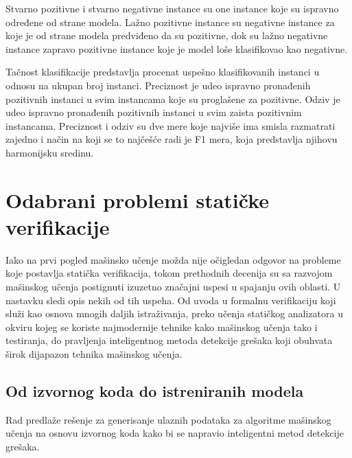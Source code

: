 \documentclass[a4paper]{article}
\theoremstyle{definition}
\begin{document}
{Stvarno pozitivne i stvarno negativne instance su one instance koje su ispravno 
određene od strane modela. Lažno pozitivne instance su negativne instance za koje 
je od strane modela predviđeno da su pozitivne, dok su lažno negativne instance 
zapravo pozitivne instance koje je model loše klasifikovao kao negativne. 

Tačnost klasifikacije predstavlja procenat uspešno klasifikovanih instanci u odnosu 
na ukupan broj instanci. Preciznost je udeo ispravno pronađenih pozitivnih instanci 
u svim instancama koje su proglašene za pozitivne. Odziv je udeo ispravno pronađenih 
pozitivnih instanci u svim zaista pozitivnim instancama. Preciznost i odziv su dve 
mere koje najviše ima smisla razmatrati zajedno i način na koji se to najčešće radi 
je F1 mera, koja predstavlja njihovu harmonijsku sredinu.



\section{Odabrani problemi statičke verifikacije}
\label{sec:naslovN}


Iako na prvi pogled mašinsko učenje možda nije očigledan odgovor na probleme
koje postavlja statička verifikacija, tokom prethodnih decenija su sa razvojom
mašinskog učenja postignuti izuzetno značajni uspesi u spajanju ovih oblasti.
U nastavku sledi opis nekih od tih uspeha. Od uvoda u formalnu verifikaciju koji 
služi kao osnova mnogih daljih istraživanja, preko učenja statičkog analizatora u okviru
kojeg se koriste najmodernije tehnike kako mašinskog učenja tako i testiranja,
do pravljenja inteligentnog metoda detekcije grešaka koji obuhvata širok dijapazon
tehnika mašinskog učenja.


\subsection{Od izvornog koda do istreniranih modela}
\label{subsec:pregled}

Rad \cite{staticFeatures} predlaže rešenje za generisanje ulaznih podataka za algoritme mašinskog učenja na osnovu
izvornog koda kako bi se napravio inteligentni metod detekcije grešaka.

}
\end{document}
